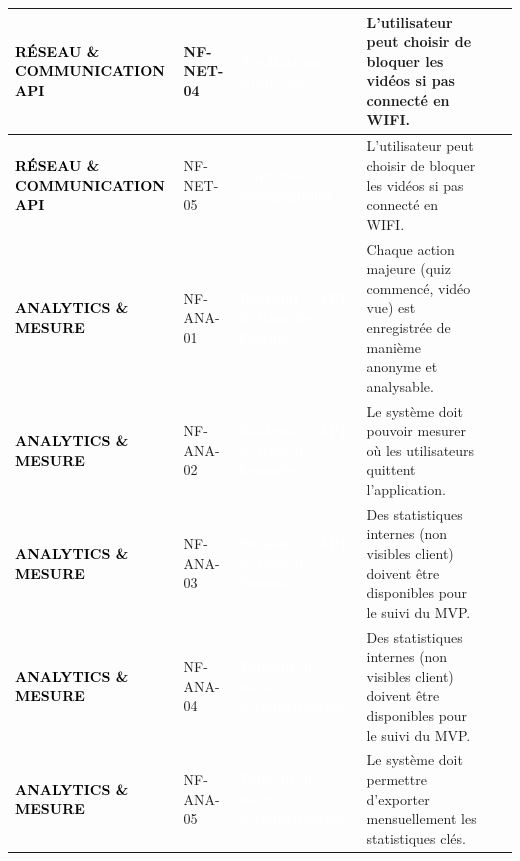 \begin{longtable}{|P{2.15cm}|P{1.55cm}|P{2.35cm}|P{5.60cm}|P{1.65cm}|P{1.45cm}|}
\textcolor{black}{\textbf{RÉSEAU \& COMMUNICATION API}} & NF-NET-04 & \textcolor{white}{\textbf{Application Apprenant}} & L’utilisateur peut choisir de bloquer les vidéos si pas connecté en WIFI. &  &  \\ \hline
{}
\textcolor{black}{\textbf{RÉSEAU \& COMMUNICATION API}} & NF-NET-05 & \textcolor{white}{\textbf{Contenus pédagogiques}} & L’utilisateur peut choisir de bloquer les vidéos si pas connecté en WIFI. &  &  \\ \hline
{}
\textcolor{black}{\textbf{ANALYTICS \& MESURE}} & NF-ANA-01 & \textcolor{white}{\textbf{Backend / API \& Base de Données}} & Chaque action majeure (quiz commencé, vidéo vue) est enregistrée de manième anonyme et analysable. &  &  \\ \hline
{}
\textcolor{black}{\textbf{ANALYTICS \& MESURE}} & NF-ANA-02 & \textcolor{white}{\textbf{Backend / API \& Base de Données}} & Le système doit pouvoir mesurer où les utilisateurs quittent l’application. &  &  \\ \hline
{}
\textcolor{black}{\textbf{ANALYTICS \& MESURE}} & NF-ANA-03 & \textcolor{white}{\textbf{Backend / API \& Base de Données}} & Des statistiques internes (non visibles client) doivent être disponibles pour le suivi du MVP. &  &  \\ \hline
{}
\textcolor{black}{\textbf{ANALYTICS \& MESURE}} & NF-ANA-04 & \textcolor{white}{\textbf{Tableau de bord Administrateur}} & Des statistiques internes (non visibles client) doivent être disponibles pour le suivi du MVP. &  &  \\ \hline
{}
\textcolor{black}{\textbf{ANALYTICS \& MESURE}} & NF-ANA-05 & \textcolor{white}{\textbf{Tableau de bord Administrateur}} & Le système doit permettre d’exporter mensuellement les statistiques clés. &  &  \\ \hline

\end{longtable}
